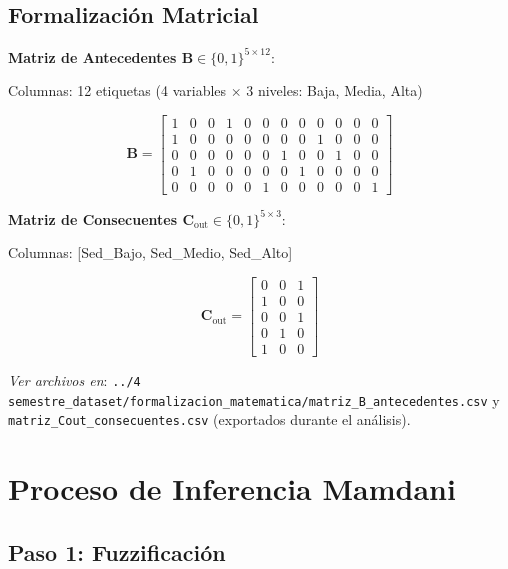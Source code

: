 \documentclass[12pt,letterpaper,twoside]{report}
\newcommand{\mat}[1]{\mathbf{#1}}
\begin{document}
\subsection{Formalización Matricial}

\begin{calculobox}
\textbf{Matriz de Antecedentes $\mat{B} \in \{0,1\}^{5 \times 12}$}:

Columnas: 12 etiquetas (4 variables $\times$ 3 niveles: Baja, Media, Alta)

\begin{equation*}
\mat{B} = 
\begin{bmatrix}
1 & 0 & 0 & 1 & 0 & 0 & 0 & 0 & 0 & 0 & 0 & 0 \\
1 & 0 & 0 & 0 & 0 & 0 & 0 & 0 & 1 & 0 & 0 & 0 \\
0 & 0 & 0 & 0 & 0 & 0 & 1 & 0 & 0 & 1 & 0 & 0 \\
0 & 1 & 0 & 0 & 0 & 0 & 0 & 1 & 0 & 0 & 0 & 0 \\
0 & 0 & 0 & 0 & 0 & 1 & 0 & 0 & 0 & 0 & 0 & 1
\end{bmatrix}
\end{equation*}

\textbf{Matriz de Consecuentes $\mat{C}_{\text{out}} \in \{0,1\}^{5 \times 3}$}:

Columnas: [Sed\_Bajo, Sed\_Medio, Sed\_Alto]

\begin{equation*}
\mat{C}_{\text{out}} = 
\begin{bmatrix}
0 & 0 & 1 \\
1 & 0 & 0 \\
0 & 0 & 1 \\
0 & 1 & 0 \\
1 & 0 & 0
\end{bmatrix}
\end{equation*}
\end{calculobox}

\textit{Ver archivos en}: \texttt{../4 semestre\_dataset/formalizacion\_matematica/matriz\_B\_antecedentes.csv} y \texttt{matriz\_Cout\_consecuentes.csv} (exportados durante el análisis).

\section{Proceso de Inferencia Mamdani}

\subsection{Paso 1: Fuzzificación}
\end{document}
